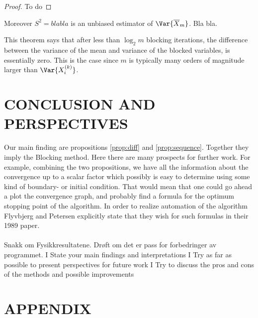 \documentclass[11pt,english,a4paper]{article}
\begin{document}
\begin{proof}
To do
\end{proof}
Moreover $S^2 = bla bla$ is an unbiased estimator of $\Var{\overline X_m}$. Bla bla.

This theorem says that after less than $\log_2 m$ blocking iterations, the difference between the variance of the mean and variance of the blocked variables, is essentially zero. This is the case since $m$ is typically many orders of magnitude larger than $\Var{X^{(k)}_i}$.
\section*{\uppercase{Conclusion and perspectives}}
Our main finding are propositions \ref{prop:diff} and \ref{prop:sequence}. Together they imply the Blocking method. Here there are many prospects for further work. For example, combining the two propositions, we have all the information about the convergence up to a scalar factor which possibly is easy to determine using some kind of boundary- or initial condition. That would mean that one could go ahead a plot the convergence graph, and probably find a formula for the optimum stopping point of the algorithm. In order to realize automation of the algorithm Flyvbjerg and Petersen explicitly state that they wish for such formulas in their 1989 paper.\\
\\
Snakk om Fysikkresultatene. Drøft om det er pass for forbedringer av programmet.
I State your main findings and interpretations
I Try as far as possible to present perspectives for future work
I Try to discuss the pros and cons of the methods and possible
improvements
\section*{\uppercase{Appendix}}
\end{document}
